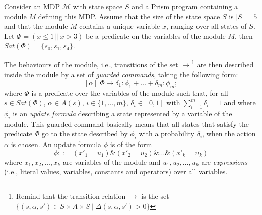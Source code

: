 \begin{example} Consider an MDP $\mathcal{M}$ with state space $S$ and a Prism program containing a module $M$ defining this MDP.
Assume that the size of the state space $S$ is $|S| = 5$ and that the module $M$ contains a unique variable $x$, ranging over all states of $S$. Let
$\Phi = (x \leq 1 \,||\, x >3)$ be a predicate on the variables of the module $M$, then $Sat(\Phi) = \{s_0, s_1, s_4\}$.
\end{example}

The behaviours of the module, i.e., transitions of the set $\rightarrow$\footnote{Remind that the transition relation $\rightarrow$ is the set $\{ (s, \alpha, s') \in S \times A \times S \; | \; \Delta(s, \alpha, s') > 0 \}$} are then described
inside the module by a set of \textit{guarded commands}, taking the following form:
\[
  [\alpha] \; \Phi \rightarrow \delta_1: \phi_1 + \dots + \delta_m: \phi_m;
\]
where $\Phi$ is a predicate over the variables of the module such that, for all $s \in Sat(\Phi)$, $\alpha \in A(s)$, $i \in \{1, \dots, m\}$, $\delta_i \in [0, 1]$ with $\sum_{i=1}^m \delta_i = 1$ and where $\phi_i$ is an \textit{update formula} describing a state represented by a variable of the module. This guarded command basically means that all states that satisfy the predicate $\Phi$ go to the state  described by $\phi_i$ with a probability $\delta_i$, when the action $\alpha$ is chosen.
An update formula $\phi$ is of the form
\[\phi::=(x'_1=u_1) \& (x'_2=u_2) \& \dots \& (x'_k=u_k)\]
where $x_1, x_2, \dots, x_k$ are variables of the module and $u_1, u_2, \dots, u_k$ are \textit{expressions} (i.e., literal values, variables, constants and operators) over all variables.
